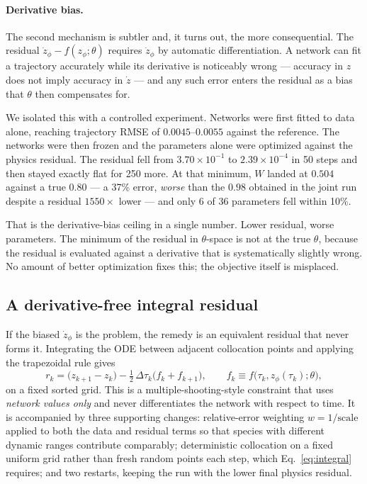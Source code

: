 \documentclass[11pt]{article}
\begin{document}
\paragraph{Derivative bias.} The second mechanism is subtler and, it turns out,
the more consequential. The residual $\dot z_\phi - f(z_\phi;\theta)$ requires
$\dot z_\phi$ by automatic differentiation. A network can fit a trajectory
accurately while its derivative is noticeably wrong --- accuracy in $z$ does not
imply accuracy in $\dot z$ --- and any such error enters the residual as a bias
that $\theta$ then compensates for.

We isolated this with a controlled experiment. Networks were first fitted to
data alone, reaching trajectory RMSE of $0.0045$--$0.0055$ against the
reference. The networks were then frozen and the parameters alone were
optimized against the physics residual. The residual fell from $3.70\times10^{-1}$
to $2.39\times10^{-4}$ in 50 steps and then stayed exactly flat for 250 more.
At that minimum, $W$ landed at $0.504$ against a true $0.80$ --- a 37\% error,
\emph{worse} than the $0.98$ obtained in the joint run despite a residual
$1550\times$ lower --- and only 6 of 36 parameters fell within 10\%.

That is the derivative-bias ceiling in a single number. Lower residual, worse
parameters. The minimum of the residual in $\theta$-space is not at the true
$\theta$, because the residual is evaluated against a derivative that is
systematically slightly wrong. No amount of better optimization fixes this; the
objective itself is misplaced.

\subsection{A derivative-free integral residual}
\label{sec:integral}

If the biased $\dot z_\phi$ is the problem, the remedy is an equivalent
residual that never forms it. Integrating the ODE between adjacent collocation
points and applying the trapezoidal rule gives
\begin{equation}
r_k = \big(z_{k+1} - z_k\big)
- \tfrac{1}{2}\,\Delta\tau_k\Big(f_k + f_{k+1}\Big),
\qquad f_k \equiv f\big(\tau_k, z_\phi(\tau_k);\theta\big),
\label{eq:integral}
\end{equation}
on a fixed sorted grid. This is a multiple-shooting-style constraint that uses
\emph{network values only} and never differentiates the network with respect to
time. It is accompanied by three supporting changes: relative-error weighting
$w = 1/\text{scale}$ applied to both the data and residual terms so that
species with different dynamic ranges contribute comparably; deterministic
collocation on a fixed uniform grid rather than fresh random points each step,
which Eq.~\eqref{eq:integral} requires; and two restarts, keeping the run with
the lower final physics residual.
\end{document}
